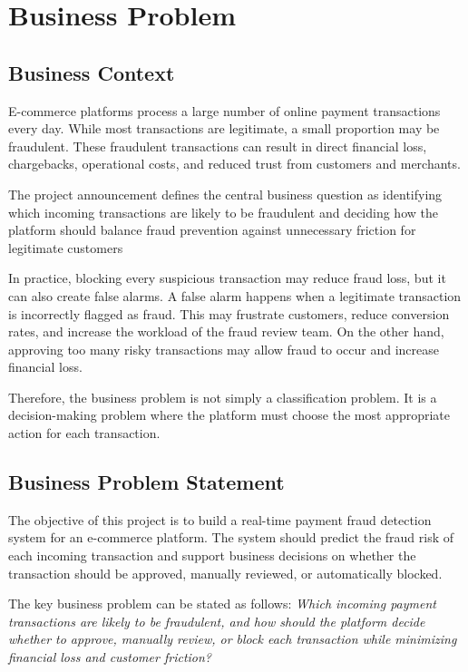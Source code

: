 \section{Business Problem}
\subsection{Business Context}
E-commerce platforms process a large number of online payment transactions every day. While most transactions are legitimate, a small proportion may be fraudulent. These fraudulent transactions can result in direct financial loss, chargebacks, operational costs, and reduced trust from customers and merchants.

The project announcement defines the central business question as identifying which incoming transactions are likely to be fraudulent and deciding how the platform should balance fraud prevention against unnecessary friction for legitimate customers

In practice, blocking every suspicious transaction may reduce fraud loss, but it can also create false alarms. A false alarm happens when a legitimate transaction is incorrectly flagged as fraud. This may frustrate customers, reduce conversion rates, and increase the workload of the fraud review team. On the other hand, approving too many risky transactions may allow fraud to occur and increase financial loss.

Therefore, the business problem is not simply a classification problem. It is a decision-making problem where the platform must choose the most appropriate action for each transaction.

\subsection{Business Problem Statement}
The objective of this project is to build a real-time payment fraud detection system for an e-commerce platform. The system should predict the fraud risk of each incoming transaction and support business decisions on whether the transaction should be approved, manually reviewed, or automatically blocked.

The key business problem can be stated as follows:
\textit{Which incoming payment transactions are likely to be fraudulent, and how should the platform decide whether to approve, manually review, or block each transaction while minimizing financial loss and customer friction?}

